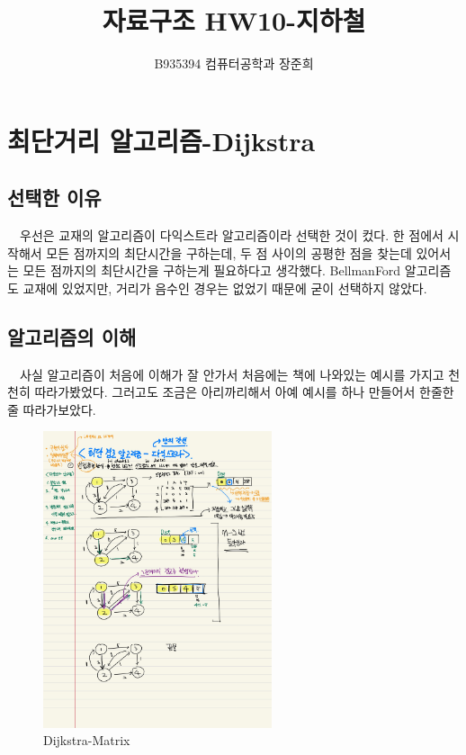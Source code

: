 \documentclass[a4paper,11pt]{article}
\begin{document}
\title{자료구조 HW10-지하철}
\author{B935394 컴퓨터공학과 장준희}
\maketitle
\newpage
\section{최단거리 알고리즘-Dijkstra}
\subsection{선택한 이유}
\ \ 우선은 교재의 알고리즘이 다익스트라 알고리즘이라 선택한 것이 컸다. 한 점에서 시작해서 모든 점까지의 최단시간을 구하는데, 두 점 사이의 공평한 점을 찾는데 있어서는 모든 점까지의 최단시간을 구하는게 필요하다고 생각했다. BellmanFord 알고리즘도 교재에 있었지만, 거리가 음수인 경우는 없었기 때문에 굳이 선택하지 않았다. 
\subsection{알고리즘의 이해}
\ \ 사실 알고리즘이 처음에 이해가 잘 안가서 처음에는 책에 나와있는 예시를 가지고 천천히 따라가봤었다. 그러고도 조금은 아리까리해서 아예 예시를 하나 만들어서 한줄한줄 따라가보았다.
\begin{figure}[h]
\begin{center}
\includegraphics[width=0.6\textwidth]{DijstraMatrix}
\caption{Dijkstra-Matrix}
\label{fig:fig1}
\end{center}
\end{figure}
\end{document}
